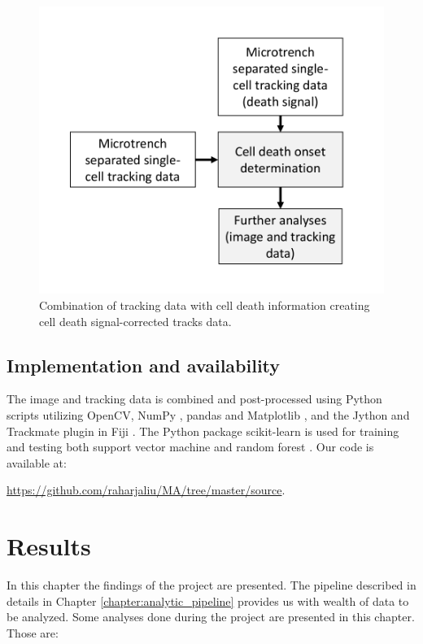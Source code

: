 \documentclass[pdftex,12pt,a4paper]{report}
\begin{document}
\begin{figure}[H]
   \centering
    \includegraphics[height=0.5\textwidth]{images/pipeline/03.pdf}
    \caption[Combination of tracking data with cell death information creating cell death signal-corrected tracks data]{Combination of tracking data with cell death information creating cell death signal-corrected tracks data.}
    \label{fig:pipeline3}
\end{figure}

\section{Implementation and availability}

The image and tracking data is combined and post-processed using Python scripts utilizing OpenCV\cite{bradski2008learning}, NumPy \cite{walt2011numpy}, pandas \cite{mckinney2010data} and Matplotlib \cite{hunter2007matplotlib}, and the Jython and Trackmate \cite{tinevez2017trackmate, pedroni2002jython} plugin in Fiji \cite{schindelin2012fiji}. The Python package scikit-learn is used for training and testing both support vector machine and random forest \cite{scikit-learn}. Our code is available at:

\href{https://github.com/raharjaliu/MA/tree/master/source}{https://github.com/raharjaliu/MA/tree/master/source}.

\chapter{Results}

In this chapter the findings of the project are presented. The pipeline described in details in Chapter \ref{chapter:analytic_pipeline} provides us with wealth of data to be analyzed. Some analyses done during the project are presented in this chapter. Those are:
\end{document}
